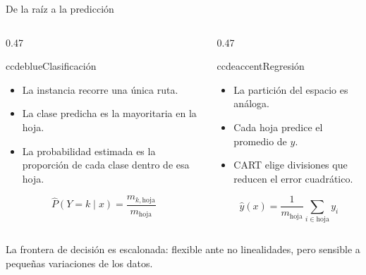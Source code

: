\documentclass[aspectratio=169,11pt,table]{beamer}
\begin{document}
\begin{frame}{De la raíz a la predicción}
\footnotesize
\begin{columns}[T,onlytextwidth]
\begin{column}{0.47\textwidth}
\begin{contrastbox}{ccdeblue}{Clasificación}
\footnotesize
\begin{itemize}
  \item La instancia recorre una única ruta.
  \item La clase predicha es la mayoritaria en la hoja.
  \item La probabilidad estimada es la proporción de cada clase dentro de esa hoja.
\end{itemize}
\[
\widehat{P}(Y=k\mid x)=\frac{m_{k,\mathrm{hoja}}}{m_{\mathrm{hoja}}}
\]
\end{contrastbox}
\end{column}
\begin{column}{0.47\textwidth}
\begin{contrastbox}{ccdeaccent}{Regresión}
\footnotesize
\begin{itemize}
  \item La partición del espacio es análoga.
  \item Cada hoja predice el promedio de \(y\).
  \item CART elige divisiones que reducen el error cuadrático.
\end{itemize}
\[
\widehat{y}(x)=\frac{1}{m_{\mathrm{hoja}}}
\sum_{i\in\mathrm{hoja}}y_i
\]
\end{contrastbox}
\end{column}
\end{columns}
\vspace{0.18cm}
\begin{keybox}
\centering
La frontera de decisión es escalonada: flexible ante no linealidades, pero sensible a pequeñas variaciones de los datos.
\end{keybox}
\end{frame}
\end{document}
